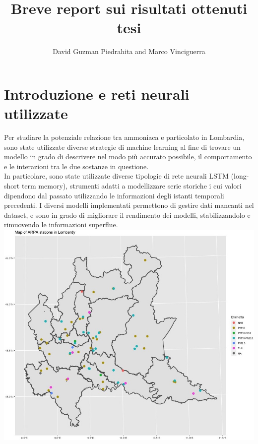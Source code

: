 \documentclass{article}
\title{Breve report sui risultati ottenuti tesi}
\author{David Guzman Piedrahita and Marco Vinciguerra}
\begin{document}
 
\maketitle        
\section{Introduzione e reti neurali utilizzate}
Per studiare la potenziale relazione tra ammoniaca e particolato in Lombardia, sono state utilizzate
diverse strategie di machine learning al fine di trovare un modello in grado di descrivere 
nel modo più accurato possibile, il comportamento e le interazioni tra le due 
sostanze in questione. 
\\In particolare, sono state utilizzate diverse tipologie di rete neurali LSTM (long-short term memory),
strumenti adatti a modellizzare serie storiche i cui valori dipendono dal passato utilizzando le informazioni degli
istanti temporali precedenti. I diversi modelli implementati permettono di 
gestire dati mancanti nel dataset, e sono in grado
di migliorare il rendimento dei modelli, stabilizzandolo e rimuovendo le informazioni superflue.
    \includegraphics[scale=0.3]{Immagini/mappaTipologie.jpeg}
\end{document}
